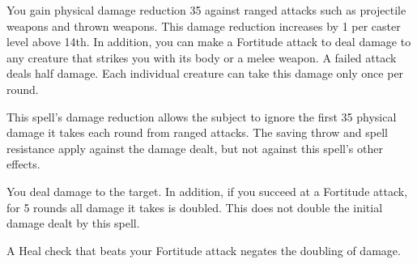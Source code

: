 \begin{spelleffect}
  You gain physical damage reduction 35 against ranged attacks such as projectile weapons and thrown weapons. This damage reduction increases by 1 per caster level above 14th. In addition, you can make a Fortitude attack to deal damage to any creature that strikes you with its body or a melee weapon. A failed attack deals half damage. Each individual creature can take this damage only once per round.
\end{spelleffect}
\begin{spellnotes}
    This spell's damage reduction allows the subject to ignore the first 35 physical damage it takes each round from ranged attacks. The saving throw and spell resistance apply against the damage dealt, but not against this spell's other effects.
\end{spellnotes}

\spellrng{\rngclose}
\begin{spelleffect}
    You deal damage to the target. In addition, if you succeed at a Fortitude attack, for 5 rounds all damage it takes is doubled. This does not double the initial damage dealt by this spell.
\end{spelleffect}
\begin{spellnotes}
    A Heal check that beats your Fortitude attack negates the doubling of damage. 
\end{spellnotes}


